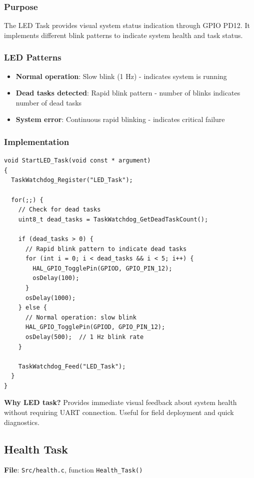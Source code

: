 \documentclass[11pt,a4paper]{article}
\begin{document}
\subsubsection{Purpose}
The LED Task provides visual system status indication through GPIO PD12. It implements different blink patterns to indicate system health and task status.

\subsubsection{LED Patterns}
\begin{itemize}
    \item \textbf{Normal operation}: Slow blink (1 Hz) - indicates system is running
    \item \textbf{Dead tasks detected}: Rapid blink pattern - number of blinks indicates number of dead tasks
    \item \textbf{System error}: Continuous rapid blinking - indicates critical failure
\end{itemize}

\subsubsection{Implementation}
\begin{lstlisting}[caption=LED Task, label=lst:ledtask]
void StartLED_Task(void const * argument)
{
  TaskWatchdog_Register("LED_Task");
  
  for(;;) {
    // Check for dead tasks
    uint8_t dead_tasks = TaskWatchdog_GetDeadTaskCount();
    
    if (dead_tasks > 0) {
      // Rapid blink pattern to indicate dead tasks
      for (int i = 0; i < dead_tasks && i < 5; i++) {
        HAL_GPIO_TogglePin(GPIOD, GPIO_PIN_12);
        osDelay(100);
      }
      osDelay(1000);
    } else {
      // Normal operation: slow blink
      HAL_GPIO_TogglePin(GPIOD, GPIO_PIN_12);
      osDelay(500);  // 1 Hz blink rate
    }
    
    TaskWatchdog_Feed("LED_Task");
  }
}
\end{lstlisting}

\textbf{Why LED task?} Provides immediate visual feedback about system health without requiring UART connection. Useful for field deployment and quick diagnostics.

\subsection{Health Task}
\textbf{File}: \texttt{Src/health.c}, function \texttt{Health\_Task()}
\end{document}
